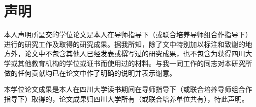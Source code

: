 
\chapter*{声\hspace{1em}明}
本人声明所呈交的学位论文是本人在导师指导下（或联合培养导师组合作指导下）进行的研究工作及取得的研究成果。据我所知，除了文中特别加以标注和致谢的地方外，论文中不包含其他人已经发表或撰写过的研究成果，也不包含为获得四川大学或其他教育机构的学位或证书而使用过的材料。与我一同工作的同志对本研究所做的任何贡献均已在论文中作了明确的说明并表示谢意。

本学位论文成果是本人在四川大学读书期间在导师指导下（或联合培养导师组合作指导下）取得的，论文成果归四川大学所有（或联合培养单位共有），特此声明。
\vspace{4cm}
\autograph
